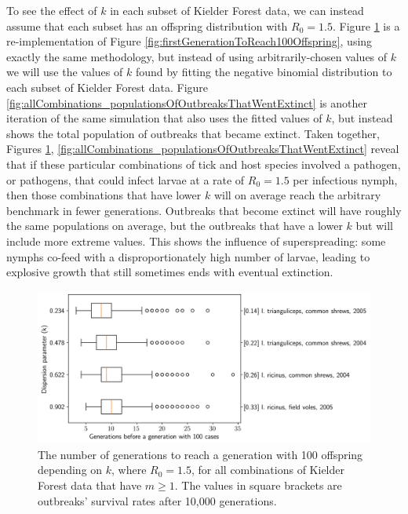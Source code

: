 \documentclass{article}
\begin{document}
To see the effect of $ k $ in each subset of Kielder Forest data, we can instead assume that each subset has an offspring distribution with $ R_0 = 1.5 $. Figure \ref{fig:allCombinations_firstGenerationReach100Offspring} is a re-implementation of Figure \ref{fig:firstGenerationToReach100Offspring}, using exactly the same methodology, but instead of using arbitrarily-chosen values of $ k $ we will use the values of $ k $ found by fitting the negative binomial distribution to each subset of Kielder Forest data. Figure \ref{fig:allCombinations_populationsOfOutbreaksThatWentExtinct} is another iteration of the same simulation that also uses the fitted values of $ k $, but instead shows the total population of outbreaks that became extinct. Taken together, Figures \ref{fig:allCombinations_firstGenerationReach100Offspring}, \ref{fig:allCombinations_populationsOfOutbreaksThatWentExtinct} reveal that if these particular combinations of tick and host species involved a pathogen, or pathogens, that could infect larvae at a rate of $ R_0 = 1.5 $ per infectious nymph, then those combinations that have lower $ k $ will on average reach the arbitrary benchmark in fewer generations. Outbreaks that become extinct will have roughly the same populations on average, but the outbreaks that have a lower $ k $ but will include more extreme values. This shows the influence of superspreading: some nymphs co-feed with a disproportionately high number of larvae, leading to explosive growth that still sometimes ends with eventual extinction.

\begin{figure}[]
	\begin{mdframed}[backgroundcolor=grey250,rightline=false,leftline=false,topline=false]
		\centering
		\includegraphics[width=.73\linewidth,valign=m]{allCombinations_firstGenerationReach100Offspring}
		\caption{The number of generations to reach a generation with 100 offspring depending on $ k $, where $ R_0 = 1.5 $, for all combinations of Kielder Forest data that have $ m \ge 1 $. The values in square brackets are outbreaks' survival rates after 10,000 generations.}
		\label{fig:allCombinations_firstGenerationReach100Offspring}
	\end{mdframed}
\end{figure}
\end{document}
